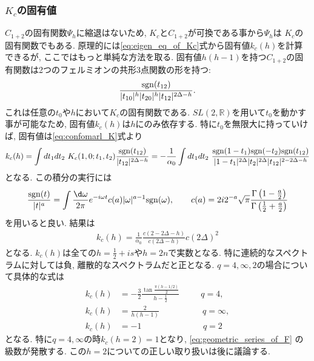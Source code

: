 \subsubsection{$K_c$の固有値}
$C_{1+2}$の固有関数$\Psi_h$に縮退はないため, $K_c$と$C_{1+2}$が可換である事から$\Psi_h$は
$K_c$の固有関数でもある. 
原理的には\eqref{eq:eigen_eq_of_Kc}式から固有値$k_c(h)$を計算できるが, 
ここではもっと単純な方法を取る. 
固有値$h(h-1)$を持つ$C_{1+2}$の固有関数は2つのフェルミオンの共形3点関数の形を持つ:
\begin{align}
	\frac{\mathrm{sgn}(t_{12})}{|t_{10}|^h|t_{20}|^h|t_{12}|^{2\Delta - h}}.
\end{align}
これは任意の$t_0$や$h$において$K_c$の固有関数である. 
$SL(2, \mathbb{R})$を用いて$t_0$を動かす事が可能なため, 固有値$k_c(h)$は$h$にのみ依存する. 
特に$t_0$を無限大に持っていけば, 固有値は\eqref{eq:confomarl_K}式より
\begin{align}
	k_c(h)
	= \int dt_1 dt_2\ K_c(1, 0; t_1, t_2)\frac{\sgn(t_{12})}{|t_{12}|^{2\Delta - h}}
	= -\frac{1}{\alpha_0}\int dt_1dt_2\ 
	\frac{\sgn(1 - t_1)\sgn(-t_2)\sgn(t_{12})}
	{|1-t_1|^{2\Delta}|t_2|^{2\Delta}|t_{12}|^{2-2\Delta-h}}
\end{align}
となる. 
この積分の実行には
\begin{align}
	\frac{\sgn(t)}{|t|^a} = \int\frac{\d\omega}{2\pi}
		e^{-i\omega t}c(a)|\omega|^{a-1}\sgn(\omega),\hspace{20pt}
		c(a) = 2i2^{-a}\sqrt{\pi}
		\frac{\Gamma\left(1-\frac{a}{2}\right)}{\Gamma\left(\frac{1}{2}+\frac{a}{2}\right)}
\end{align}
を用いると良い. 
結果は
\begin{align}
	k_c(h) = \frac{1}{\alpha_0}\frac{c(2-2\Delta-h)}{c(2\Delta-h)}c(2\Delta)^2
	\label{eq:eigenvalue_of_Kc}
\end{align}
となる. 
$k_c(h)$は全ての$h = \frac{1}{2} + is$や$h = 2n$で実数となる. 
特に連続的なスペクトラムに対しては負, 離散的なスペクトラムだと正となる. 
$q = 4, \infty, 2$の場合について具体的な式は
\begin{align}
	k_c(h) &= -\frac{3}{2}\frac{\tan\frac{\pi(h - 1/2)}{2}}{h - \frac{1}{2}}
	\hspace{30pt}q = 4,\\
	k_c(h) &= \frac{2}{h(h-1)}
	\hspace{61pt}q = \infty,\\
	k_c(h) &= -1
	\hspace{87pt}q = 2
\end{align}
となる. 特に$q = 4, \infty$の時$k_c(h=2) = 1$となり, \eqref{eq:geometric_series_of_F}
の級数が発散する. 
この$h = 2$についての正しい取り扱いは後に議論する. 

